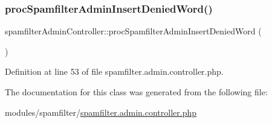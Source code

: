\subsubsection{\texorpdfstring{proc\+Spamfilter\+Admin\+Insert\+Denied\+Word()}{procSpamfilterAdminInsertDeniedWord()}}
{\footnotesize\ttfamily spamfilter\+Admin\+Controller\+::proc\+Spamfilter\+Admin\+Insert\+Denied\+Word (\begin{DoxyParamCaption}{ }\end{DoxyParamCaption})}



Definition at line 53 of file spamfilter.\+admin.\+controller.\+php.



The documentation for this class was generated from the following file\+:\begin{DoxyCompactItemize}
\item 
modules/spamfilter/\hyperlink{spamfilter_8admin_8controller_8php}{spamfilter.\+admin.\+controller.\+php}\end{DoxyCompactItemize}
